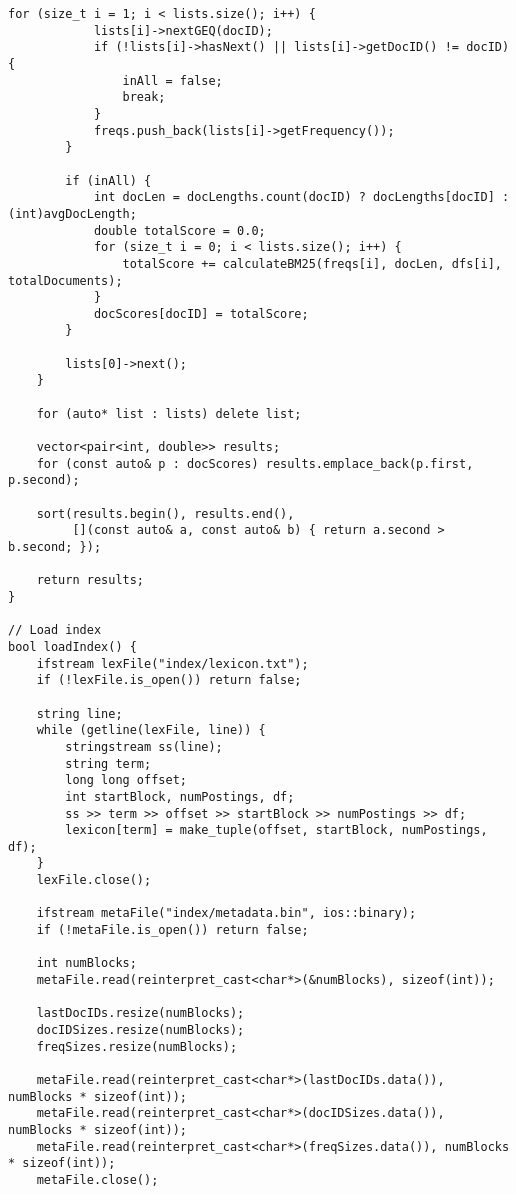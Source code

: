 \documentclass{article}
\begin{document}
\begin{lstlisting}[caption={The complete source code for the query processor component.}, label={lst:query}]
        for (size_t i = 1; i < lists.size(); i++) {
            lists[i]->nextGEQ(docID);
            if (!lists[i]->hasNext() || lists[i]->getDocID() != docID) {
                inAll = false;
                break;
            }
            freqs.push_back(lists[i]->getFrequency());
        }
        
        if (inAll) {
            int docLen = docLengths.count(docID) ? docLengths[docID] : (int)avgDocLength;
            double totalScore = 0.0;
            for (size_t i = 0; i < lists.size(); i++) {
                totalScore += calculateBM25(freqs[i], docLen, dfs[i], totalDocuments);
            }
            docScores[docID] = totalScore;
        }
        
        lists[0]->next();
    }
    
    for (auto* list : lists) delete list;
    
    vector<pair<int, double>> results;
    for (const auto& p : docScores) results.emplace_back(p.first, p.second);
    
    sort(results.begin(), results.end(),
         [](const auto& a, const auto& b) { return a.second > b.second; });
    
    return results;
}

// Load index
bool loadIndex() {
    ifstream lexFile("index/lexicon.txt");
    if (!lexFile.is_open()) return false;
    
    string line;
    while (getline(lexFile, line)) {
        stringstream ss(line);
        string term;
        long long offset;
        int startBlock, numPostings, df;
        ss >> term >> offset >> startBlock >> numPostings >> df;
        lexicon[term] = make_tuple(offset, startBlock, numPostings, df);
    }
    lexFile.close();
    
    ifstream metaFile("index/metadata.bin", ios::binary);
    if (!metaFile.is_open()) return false;
    
    int numBlocks;
    metaFile.read(reinterpret_cast<char*>(&numBlocks), sizeof(int));
    
    lastDocIDs.resize(numBlocks);
    docIDSizes.resize(numBlocks);
    freqSizes.resize(numBlocks);
    
    metaFile.read(reinterpret_cast<char*>(lastDocIDs.data()), numBlocks * sizeof(int));
    metaFile.read(reinterpret_cast<char*>(docIDSizes.data()), numBlocks * sizeof(int));
    metaFile.read(reinterpret_cast<char*>(freqSizes.data()), numBlocks * sizeof(int));
    metaFile.close();
    

\end{lstlisting}
\end{document}
